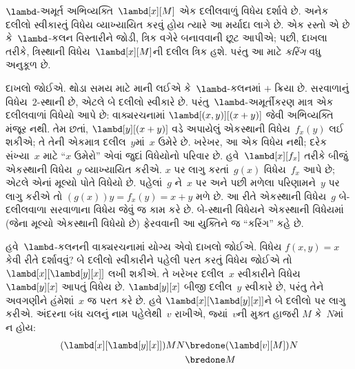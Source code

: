 \documentclass[../../../include/open-logic-section]{subfiles}
\begin{document}

$\lambd$-અમૂર્ત અભિવ્યક્તિ~$\lambd[x][M]$ એક દલીલવાળું
વિધેય દર્શાવે છે. અનેક દલીલો સ્વીકારતું વિધેય વ્યાખ્યાયિત કરવું
હોય ત્યારે આ મર્યાદા લાગે છે. એક રસ્તો એ છે કે~$\lambd$-કલન
વિસ્તારીને જોડી, ત્રિક વગેરે બનાવવાની છૂટ આપીએ; પછી, દાખલા
તરીકે, ત્રિસ્થાની વિધેય~$\lambd[x][M]$ની દલીલ ત્રિક હશે.
પરંતુ આ માટે \emph{કરિંગ} વધુ અનુકૂળ છે.

દાખલો જોઈએ. થોડા સમય માટે માની લઈએ કે~$\lambd$-કલનમાં
$+$ ક્રિયા છે. સરવાળાનું વિધેય~$2$-સ્થાની છે, એટલે બે દલીલો
સ્વીકારે છે. પરંતુ~$\lambd$-અમૂર્તીકરણ માત્ર એક દલીલવાળાં વિધેયો
આપે છે: વાક્યરચનામાં $\lambd[(x,y)][(x+y)]$ જેવી અભિવ્યક્તિ
મંજૂર નથી. તેમ છતાં, $\lambd[y][(x+y)]$ વડે અપાયેલું એકસ્થાની
વિધેય~$f_x(y)$ લઈ શકીએ; તે તેની એકમાત્ર દલીલ~$y$માં~$x$ ઉમેરે
છે. ખરેખર, આ એક વિધેય નથી; દરેક સંખ્યા~$x$ માટે ``$x$ ઉમેરો''
એવાં જુદાં વિધેયોનો પરિવાર છે. હવે~$\lambd[x][f_x]$ તરીકે બીજું
એકસ્થાની વિધેય~$g$ વ્યાખ્યાયિત કરીએ. $x$ પર લાગુ કરતાં~$g(x)$
વિધેય~$f_x$ આપે છે; એટલે એનાં મૂલ્યો પોતે વિધેયો છે. પહેલાં~$g$
ને~$x$ પર અને પછી મળેલા પરિણામને~$y$ પર લાગુ કરીએ તો
$(g(x))y = f_x(y) = x+y$ મળે છે. આ રીતે એકસ્થાની વિધેય~$g$
બે-દલીલવાળા સરવાળાના વિધેય જેવું જ કામ કરે છે. બે-સ્થાની વિધેયને
એકસ્થાની વિધેયમાં (જેના મૂલ્યો એકસ્થાની વિધેયો છે) ફેરવવાની
આ યુક્તિને જ ``કરિંગ'' કહે છે.

હવે~$\lambd$-કલનની વાક્યરચનામાં યોગ્ય એવો દાખલો જોઈએ.
વિધેય $f(x,y) = x$ કેવી રીતે દર્શાવવું? બે દલીલો સ્વીકારીને
પહેલી પરત કરતું વિધેય જોઈએ તો $\lambd[x][\lambd[y][x]]$ લખી
શકીએ. તે ખરેખર દલીલ~$x$ સ્વીકારીને વિધેય~$\lambd[y][x]$
આપતું વિધેય છે. $\lambd[y][x]$ બીજી દલીલ~$y$ સ્વીકારે છે,
પરંતુ તેને અવગણીને હંમેશાં~$x$ જ પરત કરે છે. હવે
$\lambd[x][\lambd[y][x]]$ને બે દલીલો પર લાગુ કરીએ.
અંદરના બંધ ચલનું નામ પહેલેથી~$v$ રાખીએ, જ્યાં~$v$ની મુક્ત હાજરી
$M$ કે~$N$માં ન હોય:
\begin{align*}
  (\lambd[x][\lambd[y][x]])MN
  \bredone & (\lambd[v][M])N \\
  \bredone & M
\end{align*}
\end{document}
